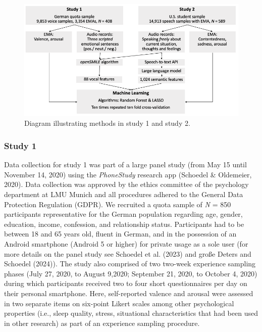 \documentclass[
  english,
  man,floatsintext]{apa6}
\begin{document}
\begin{figure}

{\centering \includegraphics[width=1\linewidth]{../figures/methods_figure} 

}

\caption[Method diagram]{Diagram illustrating methods in study 1 and study 2.}\label{fig:methodsoverview}
\end{figure}

\hypertarget{study-1}{%
\subsubsection{Study 1}\label{study-1}}

Data collection for study 1 was part of a large panel study (from May 15 until November 14, 2020) using the \emph{PhoneStudy} research app (Schoedel \& Oldemeier, 2020). Data collection was approved by the ethics committee of the psychology department at LMU Munich and all procedures adhered to the General Data Protection Regulation (GDPR). We recruited a quota sample of \emph{N} = 850 participants representative for the German population regarding age, gender, education, income, confession, and relationship status. Participants had to be between 18 and 65 years old, fluent in German, and in the possession of an Android smartphone (Android 5 or higher) for private usage as a sole user (for more details on the panel study see Schoedel et al. (2023) and große Deters and Schoedel (2024)). The study also comprised of two two-week experience sampling phases (July 27, 2020, to August 9,2020; September 21, 2020, to October 4, 2020) during which participants received two to four short questionnaires per day on their personal smartphone. Here, self-reported valence and arousal were assessed in two separate items on six-point Likert scales among other psychological properties (i.e., sleep quality, stress, situational characteristics that had been used in other research) as part of an experience sampling procedure.
\end{document}
